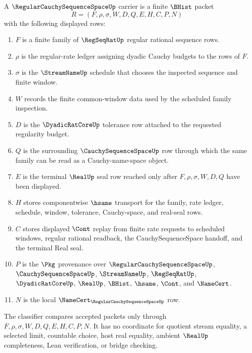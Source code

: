 \begin{definition}
\label{def:regular-cauchy-sequence-space-carrier}
A $\RegularCauchySequenceSpaceUp$ carrier is a finite $\BHist$ packet
$$
R=(F,\rho,\sigma,W,D,Q,E,H,C,P,N)
$$
with the following displayed rows:
\begin{enumerate}
\item $F$ is a finite family of $\RegSeqRatUp$ regular rational sequence rows.
\item $\rho$ is the regular-rate ledger assigning dyadic Cauchy budgets to the rows of $F$.
\item $\sigma$ is the $\StreamNameUp$ schedule that chooses the inspected sequence and finite window.
\item $W$ records the finite common-window data used by the scheduled family inspection.
\item $D$ is the $\DyadicRatCoreUp$ tolerance row attached to the requested regularity budget.
\item $Q$ is the surrounding $\CauchySequenceSpaceUp$ row through which the same family can be read as a Cauchy-name-space object.
\item $E$ is the terminal $\RealUp$ seal row reached only after $F,\rho,\sigma,W,D,Q$ have been displayed.
\item $H$ stores componentwise $\hsame$ transport for the family, rate ledger, schedule, window, tolerance, Cauchy-space, and real-seal rows.
\item $C$ stores displayed $\Cont$ replay from finite rate requests to scheduled windows, regular rational readback, the CauchySequenceSpace handoff, and the terminal Real seal.
\item $P$ is the $\Pkg$ provenance over $\RegularCauchySequenceSpaceUp$, $\CauchySequenceSpaceUp$, $\StreamNameUp$, $\RegSeqRatUp$, $\DyadicRatCoreUp$, $\RealUp$, $\BHist$, $\hsame$, $\Cont$, and $\NameCert$.
\item $N$ is the local $\NameCert_{\RegularCauchySequenceSpaceUp}$ row.
\end{enumerate}
The classifier compares accepted packets only through $F,\rho,\sigma,W,D,Q,E,H,C,P,N$. It has no coordinate for quotient stream equality, a selected limit, countable choice, host real equality, ambient $\RealUp$ completeness, Lean verification, or bridge checking.
\end{definition}

